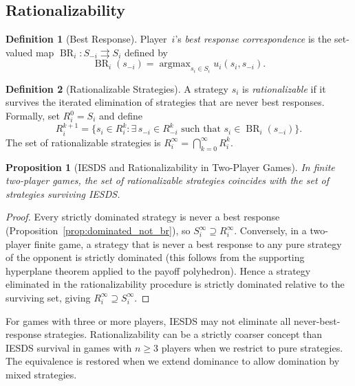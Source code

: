 \documentclass[11pt,a4paper]{article}
\theoremstyle{definition}
\newtheorem{definition}{Definition}[section]
\theoremstyle{plain}
\newtheorem{proposition}[theorem]{Proposition}
\theoremstyle{remark}
\DeclareMathOperator{\argmax}{argmax}
\DeclareMathOperator{\BR}{BR}
\begin{document}
\subsection{Rationalizability}
\label{subsec:rationalizability}

\begin{definition}[Best Response]
\label{def:best_response}
Player~$i$'s \emph{best response correspondence} is the set-valued map
$\BR_i : S_{-i} \rightrightarrows S_i$ defined by
\[
    \BR_i(s_{-i}) = \argmax_{s_i \in S_i} u_i(s_i, s_{-i}).
\]
\end{definition}

\begin{definition}[Rationalizable Strategies]
\label{def:rationalizable}
A strategy $s_i$ is \emph{rationalizable} if it survives the iterated elimination
of strategies that are never best responses. Formally, set $R_i^0 = S_i$ and define
\[
    R_i^{k+1} = \big\{s_i \in R_i^k : \exists\, s_{-i} \in R_{-i}^k
    \text{ such that } s_i \in \BR_i(s_{-i})\big\}.
\]
The set of rationalizable strategies is $R_i^\infty = \bigcap_{k=0}^\infty R_i^k$.
\end{definition}

\begin{proposition}[IESDS and Rationalizability in Two-Player Games]
\label{prop:iesds_rational}
In finite two-player games, the set of rationalizable strategies coincides with the
set of strategies surviving IESDS.
\end{proposition}

\begin{proof}
Every strictly dominated strategy is never a best response
(Proposition~\ref{prop:dominated_not_br}), so
$S_i^\infty \supseteq R_i^\infty$. Conversely, in a two-player finite game,
a strategy that is never a best response to any pure strategy of the opponent is
strictly dominated (this follows from the supporting hyperplane theorem applied
to the payoff polyhedron). Hence a strategy eliminated in the rationalizability
procedure is strictly dominated relative to the surviving set, giving
$R_i^\infty \supseteq S_i^\infty$.
\end{proof}

\begin{warning}
For games with three or more players, IESDS may not eliminate all never-best-response
strategies. Rationalizability can be a strictly coarser concept than IESDS survival
in games with $n \geq 3$ players when we restrict to pure strategies. The equivalence
is restored when we extend dominance to allow domination by mixed strategies.
\end{warning}
\end{document}
